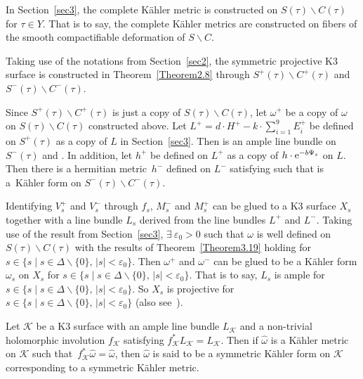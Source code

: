 \documentclass[pdftex]{sigma}
\numberwithin{equation}{section}
\begin{document}
In Section~\ref{sec3}, the complete K\"ahler metric is constructed on $S(\tau)\backslash C(\tau)$ for $\tau \in Y$. That is to say, the complete K\"ahler metrics are constructed on fibers of the smooth compactifiable deformation of $S\backslash C$.

Taking use of the notations from Section~\ref{sec2}, the symmetric projective K3 surface is constructed in Theorem~\ref{Theorem2.8} through $S^+(\tau)\backslash C^+(\tau)$ and $S^-(\tau)\backslash C^-(\tau)$.

Since $S^+(\tau)\backslash C^+(\tau)$ is just a copy of $S(\tau)\backslash C(\tau)$, let $\omega^+$ be a copy of $\omega$ on $S(\tau)\backslash C(\tau)$ constructed above. Let $L^{+}=d\cdot H^{+}-k \cdot \sum _{i=1}^9 E_i^{+}$ be defined on $S^+(\tau)$ as a copy of $L$ in Section~\ref{sec3}. Then  is an ample line bundle on $S^-(\tau)$ and . In addition, let $h^+$ be defined on $L^+$ as a copy of $h\cdot {\rm e}^{-b\Psi_s}$ on $L$. Then there is a hermitian metric~$h^-$ defined on $L^-$ satisfying  such that  is a~K\"ahler form on $S^-(\tau)\backslash C^-(\tau)$.

Identifying $V_s^+$ and $V_s^-$ through $f_s$, $M^-_s$ and $M^+_s$ can be glued to a K3 surface $X_s$ together with a line bundle $L_s$ derived from the line bundles $L^+$ and $L^-$. Taking use of the result from Section~\ref{sec3}, $\exists \ \varepsilon_0 >0$ such that $\omega$ is well defined on $S(\tau)\backslash C(\tau)$ with the results of Theorem~\ref{Theorem3.19} holding for $s \in \{ s\mid s \in \Delta \backslash \{ 0 \},\, |s|<\varepsilon_0 \}$. Then $\omega^+$ and $\omega^-$ can be glued to be a K\"ahler form $\omega_s$ on $X_s$ for $s \in \{ s\mid s \in \Delta \backslash \{ 0 \},\, |s|<\varepsilon_0 \}$. That is to say, $L_s$ is ample for~${s \in \{ s\mid s \in \Delta \backslash \{ 0 \},\, |s|<\varepsilon_0 \}}$. So $X_s$ is projective for $s \in \{ s\mid s \in \Delta \backslash \{ 0 \}, \, |s|<\varepsilon_0 \}$ (also see~\cite[Theorem~1.2]{Takayuki-Takato2}).

\begin{Definition} \label{Definition4.1}
Let $\mathcal{K}$ be a K3 surface with an ample line bundle $L_\mathcal{K}$ and a non-trivial holomorphic involution $f_\mathcal{K}$ satisfying $f^*_{\mathcal{K}}L_{\mathcal{K}}=L_{\mathcal{K}}$. Then if $\widehat{\omega}$ is a K\"ahler metric on $\mathcal{K}$ such that~${f^*_{\mathcal{K}}\widehat{\omega}=\widehat{\omega}}$, then $\widehat{\omega}$ is said to be a symmetric K\"ahler form on $\mathcal{K}$ corresponding to a symmetric K\"ahler metric.
\end{Definition}
\end{document}

